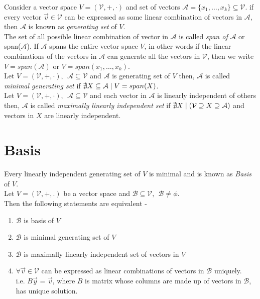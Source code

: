 \documentclass{article}
\newcommand{\suchthat}{\;\ifnum\currentgrouptype=16 \middle\fi|\;}%
\begin{document}
Consider a vector space $V=(\mathcal{V},+,\cdot)$ and set of vectors $\mathcal{A}=\{ {x_1},\ldots ,{x_k}\} \subseteq \mathcal{V}$. if every vector $\vec{v} \in \mathcal{V} $  can be expressed as some linear combination of vectors in $\mathcal{A}$, then $\mathcal{A}$ is known as \textit{generating set} of $V$. \\

The set of all possible linear combination of vector in $\mathcal{A}$ is called \textit{span of} $\mathcal{A}$ or span($\mathcal{A}$). If $\mathcal{A}$ spans the entire vector space $V$, in other words if the linear combinations of the vectors in $\mathcal{A}$ can generate all the vectors in $\mathcal{V}$, then we write $V=span(\mathcal{A})$ or $V=span(x_1,\ldots,x_k)$.\\

Let $V=(\mathcal{V},+,\cdot),~~\mathcal{A}\subseteq\mathcal{V}$ and $\mathcal{A}$ is generating set of $V$ then, $\mathcal{A}$ is called \textit{minimal generating set} if $\nexists X \subseteq \mathcal{A} \suchthat V=span(X)$. \\

Let $V=(\mathcal{V},+,\cdot),~~\mathcal{A}\subseteq\mathcal{V}$ and each vector in $\mathcal{A}$ is linearly independent of others then, $\mathcal{A}$ is called \textit{maximally linearly independent set} if $\nexists X \suchthat (\mathcal{V} \supseteq X \supseteq \mathcal{A})$ and vectors in $X$ are linearly independent. \\

\section{Basis}
Every linearly independent generating set of $V$ is minimal and is known as \textit{Basis} of $V$.\\

Let $V=(\mathcal{V},+, .)$ be a vector space and $\mathcal{B}\subseteq\mathcal{V},~~ \mathcal{B} \ne \phi$.\\
Then the following statements are equivalent -
\begin{enumerate}[i]
    \item $\mathcal{B}$ is basis of $V$
    \item $\mathcal{B}$ is minimal generating set of $V$
    \item $\mathcal{B}$ is maximally linearly independent set of vectors in $V$
    \item $\forall \vec{v}\in\mathcal{V}$ can be expressed as linear combinations of vectors in $\mathcal{B}$ uniquely.\\
    i.e. $B\vec{y}$ = $\Vec{v}$, where $B$ is matrix whose columns are made up of vectors in $\mathcal{B}$, has unique solution.
\end{enumerate}
\end{document}
